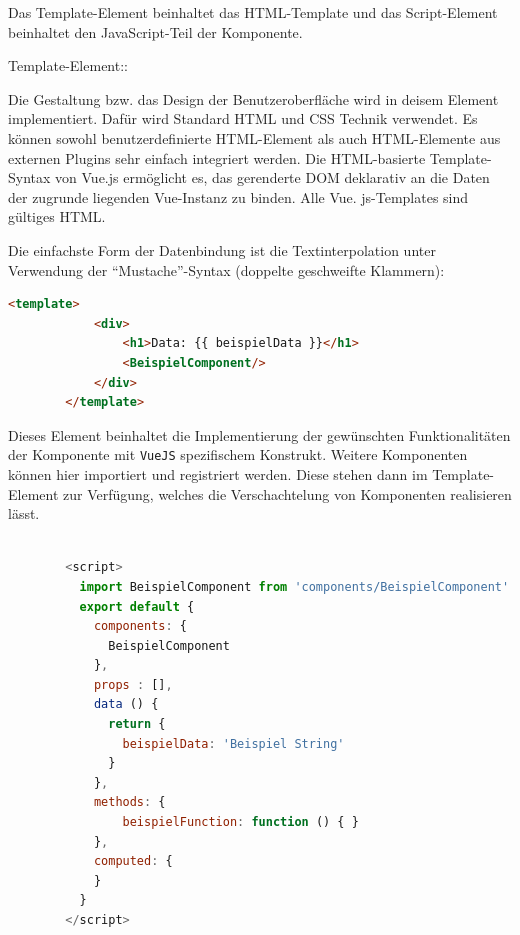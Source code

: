 Das Template-Element beinhaltet das HTML-Template und das Script-Element beinhaltet den JavaScript-Teil der Komponente.
\begin{labeling}{Template-Element::}
	\item [Template-Element:] Die Gestaltung bzw. das Design der Benutzeroberfläche wird in deisem Element implementiert. Dafür wird Standard HTML und CSS Technik verwendet. Es können sowohl benutzerdefinierte HTML-Element als auch HTML-Elemente aus externen Plugins sehr einfach integriert werden. Die HTML-basierte Template-Syntax von Vue.js ermöglicht es, das gerenderte DOM deklarativ an die Daten der zugrunde liegenden Vue-Instanz zu binden. Alle Vue. js-Templates sind gültiges HTML.
	
	Die einfachste Form der Datenbindung ist die Textinterpolation unter Verwendung der \enquote{Mustache}-Syntax (doppelte geschweifte Klammern):
	\begin{lstlisting}[language=html,label={lst:label}, caption=Templateelement]
        <template>
            <div>
                <h1>Data: {{ beispielData }}</h1>
                <BeispielComponent/>
            </div>
        </template>    
        \end{lstlisting}
	\item [Script-Element:] Dieses Element beinhaltet die Implementierung der gewünschten Funktionalitäten der Komponente mit \texttt{VueJS} spezifischem Konstrukt. Weitere Komponenten können hier importiert und registriert werden. Diese stehen dann im Template-Element zur Verfügung, welches die Verschachtelung von Komponenten realisieren lässt.
	\begin{lstlisting}[language=JavaScript,label={lst:label}, caption=Skriptelement]
        
        <script>
          import BeispielComponent from 'components/BeispielComponent'
          export default {
            components: {
              BeispielComponent
            },
            props : [],
            data () {
              return {
                beispielData: 'Beispiel String'
              }
            },
            methods: {
                beispielFunction: function () { }
            },
            computed: {
            }
          }
        </script>
        
        \end{lstlisting}
\end{labeling}


